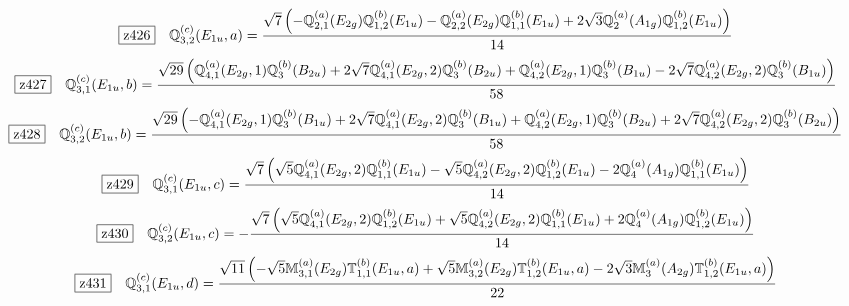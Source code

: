 \documentclass[fleqn,10pt,landscape]{jsarticle}
\begin{document}
\begin{dmath*}
\hspace*{3mm}\fbox{z426}\quad \mathbb{Q}_{3,2}^{(c)}(E_{1u},a)=\frac{\sqrt{7} \left(- \mathbb{Q}_{2,1}^{(a)}(E_{2g}) \mathbb{Q}_{1,2}^{(b)}(E_{1u}) - \mathbb{Q}_{2,2}^{(a)}(E_{2g}) \mathbb{Q}_{1,1}^{(b)}(E_{1u}) + 2 \sqrt{3} \mathbb{Q}_{2}^{(a)}(A_{1g}) \mathbb{Q}_{1,2}^{(b)}(E_{1u})\right)}{14}
\end{dmath*}
\begin{dmath*}
\hspace*{3mm}\fbox{z427}\quad \mathbb{Q}_{3,1}^{(c)}(E_{1u},b)=\frac{\sqrt{29} \left(\mathbb{Q}_{4,1}^{(a)}(E_{2g},1) \mathbb{Q}_{3}^{(b)}(B_{2u}) + 2 \sqrt{7} \mathbb{Q}_{4,1}^{(a)}(E_{2g},2) \mathbb{Q}_{3}^{(b)}(B_{2u}) + \mathbb{Q}_{4,2}^{(a)}(E_{2g},1) \mathbb{Q}_{3}^{(b)}(B_{1u}) - 2 \sqrt{7} \mathbb{Q}_{4,2}^{(a)}(E_{2g},2) \mathbb{Q}_{3}^{(b)}(B_{1u})\right)}{58}
\end{dmath*}
\begin{dmath*}
\hspace*{3mm}\fbox{z428}\quad \mathbb{Q}_{3,2}^{(c)}(E_{1u},b)=\frac{\sqrt{29} \left(- \mathbb{Q}_{4,1}^{(a)}(E_{2g},1) \mathbb{Q}_{3}^{(b)}(B_{1u}) + 2 \sqrt{7} \mathbb{Q}_{4,1}^{(a)}(E_{2g},2) \mathbb{Q}_{3}^{(b)}(B_{1u}) + \mathbb{Q}_{4,2}^{(a)}(E_{2g},1) \mathbb{Q}_{3}^{(b)}(B_{2u}) + 2 \sqrt{7} \mathbb{Q}_{4,2}^{(a)}(E_{2g},2) \mathbb{Q}_{3}^{(b)}(B_{2u})\right)}{58}
\end{dmath*}
\begin{dmath*}
\hspace*{3mm}\fbox{z429}\quad \mathbb{Q}_{3,1}^{(c)}(E_{1u},c)=\frac{\sqrt{7} \left(\sqrt{5} \mathbb{Q}_{4,1}^{(a)}(E_{2g},2) \mathbb{Q}_{1,1}^{(b)}(E_{1u}) - \sqrt{5} \mathbb{Q}_{4,2}^{(a)}(E_{2g},2) \mathbb{Q}_{1,2}^{(b)}(E_{1u}) - 2 \mathbb{Q}_{4}^{(a)}(A_{1g}) \mathbb{Q}_{1,1}^{(b)}(E_{1u})\right)}{14}
\end{dmath*}
\begin{dmath*}
\hspace*{3mm}\fbox{z430}\quad \mathbb{Q}_{3,2}^{(c)}(E_{1u},c)=- \frac{\sqrt{7} \left(\sqrt{5} \mathbb{Q}_{4,1}^{(a)}(E_{2g},2) \mathbb{Q}_{1,2}^{(b)}(E_{1u}) + \sqrt{5} \mathbb{Q}_{4,2}^{(a)}(E_{2g},2) \mathbb{Q}_{1,1}^{(b)}(E_{1u}) + 2 \mathbb{Q}_{4}^{(a)}(A_{1g}) \mathbb{Q}_{1,2}^{(b)}(E_{1u})\right)}{14}
\end{dmath*}
\begin{dmath*}
\hspace*{3mm}\fbox{z431}\quad \mathbb{Q}_{3,1}^{(c)}(E_{1u},d)=\frac{\sqrt{11} \left(- \sqrt{5} \mathbb{M}_{3,1}^{(a)}(E_{2g}) \mathbb{T}_{1,1}^{(b)}(E_{1u},a) + \sqrt{5} \mathbb{M}_{3,2}^{(a)}(E_{2g}) \mathbb{T}_{1,2}^{(b)}(E_{1u},a) - 2 \sqrt{3} \mathbb{M}_{3}^{(a)}(A_{2g}) \mathbb{T}_{1,2}^{(b)}(E_{1u},a)\right)}{22}
\end{dmath*}
\end{document}
